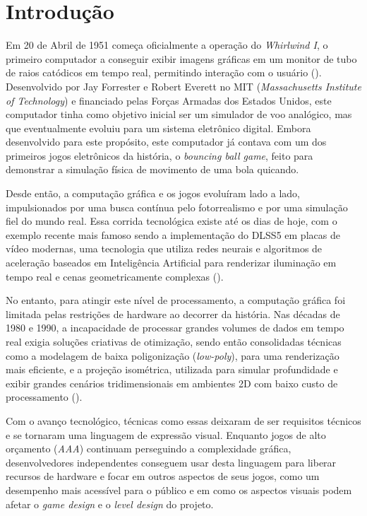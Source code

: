 
\chapter{Introdução}
\label{cap:introducao}

Em 20 de Abril de 1951 começa oficialmente a operação do \textit{Whirlwind I}, o primeiro computador
a conseguir exibir imagens gráficas em um monitor de tubo de raios catódicos em tempo real,
permitindo interação com o usuário (\cite{whirlwind}). Desenvolvido por Jay Forrester e Robert Everett no
MIT (\textit{Massachusetts Institute of Technology}) e financiado pelas Forças Armadas dos Estados
Unidos, este computador tinha como objetivo inicial ser um simulador de voo analógico, mas
que eventualmente evoluiu para um sistema eletrônico digital. Embora desenvolvido para este
propósito, este computador já contava com um dos primeiros jogos eletrônicos da história, o
\textit{bouncing ball game}, feito para demonstrar a simulação física de movimento de uma bola quicando.

Desde então, a computação gráfica e os jogos evoluíram lado a lado, impulsionados por uma
busca contínua pelo fotorrealismo e por uma simulação fiel do mundo real. Essa corrida
tecnológica existe até os dias de hoje, com o exemplo recente mais famoso sendo a
implementação do DLSS5 em placas de vídeo modernas, uma tecnologia que utiliza redes neurais
e algoritmos de aceleração baseados em Inteligência Artificial para renderizar iluminação em
tempo real e cenas geometricamente complexas (\cite{dlss5}).

No entanto, para atingir este nível de processamento, a computação gráfica foi limitada pelas
restrições de hardware ao decorrer da história. Nas décadas de 1980 e 1990, a incapacidade de
processar grandes volumes de dados em tempo real exigia soluções criativas de otimização,
sendo então consolidadas técnicas como a modelagem de baixa poligonização (\textit{low-poly}), para
uma renderização mais eficiente, e a projeção isométrica, utilizada para simular profundidade e
exibir grandes cenários tridimensionais em ambientes 2D com baixo custo de processamento (\cite{low-poly-history}).

Com o avanço tecnológico, técnicas como essas deixaram de ser requisitos técnicos e se
tornaram uma linguagem de expressão visual. Enquanto jogos de alto orçamento (\textit{AAA})
continuam perseguindo a complexidade gráfica, desenvolvedores independentes conseguem
usar desta linguagem para liberar recursos de hardware e focar em outros aspectos de seus
jogos, como um desempenho mais acessível para o público e em como os aspectos visuais
podem afetar o \textit{game design} e o \textit{level design} do projeto.

